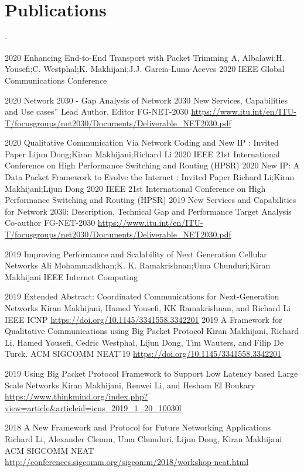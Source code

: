 \newpage
\section{Publications}
- 
\begin{entrylist}
\entry
{2020}
{Enhancing End-to-End Transport with Packet Trimming}
{A, Albalawi;H. Yousefi;C. Westphal;K. Makhijani;J.J. Garcia-Luna-Aceves}
{2020 IEEE Global Communications Conference}

\entry
{2020}
{Network 2030 - Gap Analysis of Network 2030 New Services, Capabilities and Use cases​”}
{Lead Author, Editor}
{FG-NET-2030 \url{https://www.itu.int/en/ITU-T/focusgroups/net2030/Documents/Deliverable_NET2030.pdf}}

\entry
{2020}
{Qualitative Communication Via Network Coding and New IP : Invited Paper}
{Lijun Dong;Kiran Makhijani;Richard Li}
{2020 IEEE 21st International Conference on High Performance Switching and Routing (HPSR)}
\entry
{2020}
{New IP: A Data Packet Framework to Evolve the Internet : Invited Paper}
{Richard Li;Kiran Makhijani;Lijun Dong}
{2020 IEEE 21st International Conference on High Performance Switching and Routing (HPSR)}
\entry
{2019}
{New Services and Capabilities for Network 2030: Description, Technical Gap and Performance Target Analysis​}
{Co-author}
{FG-NET-2030 \url{https://www.itu.int/en/ITU-T/focusgroups/net2030/Documents/Deliverable_NET2030.pdf}}

\entry 
{2019}
{Improving Performance and Scalability of Next Generation Cellular Networks}
{Ali Mohammadkhan;K. K. Ramakrishnan;Uma Chunduri;Kiran Makhijani}
{IEEE Internet Computing}

\entry
{2019}
{Extended Abstract: Coordinated Communications for Next-Generation Networks}
{Kiran Makhijani, Hamed Yousefi, KK Ramakrishnan, and Richard Li}
{IEEE ICNP \url{https://doi.org/10.1145/3341558.3342201}}
\entry
{2019}
{A Framework for Qualitative Communications using Big Packet Protocol}
{Kiran Makhijani, Richard Li, Hamed Yousefi, Cedric Westphal, Lijun Dong, Tim Wauters, and Filip De Turck.}
{ACM SIGCOMM NEAT'19 \url{https://doi.org/10.1145/3341558.3342201}}

\entry
{2019}
{Using Big Packet Protocol Framework to Support Low Latency based Large Scale Networks}
{Kiran Makhijani, Renwei Li, and Hesham El Boukary}
{\url{https://www.thinkmind.org/index.php?view=article&articleid=icns_2019_1_20_10030l}}

\entry
{2018}
{A New Framework and Protocol for Future Networking Applications}
{Richard Li, Alexander Clemm, Uma Chunduri, Lijun Dong, Kiran Makhijani}
{ACM SIGCOMM NEAT \url{http://conferences.sigcomm.org/sigcomm/2018/workshop-neat.html}}
 

\end{entrylist}

